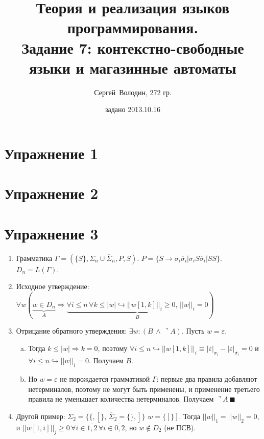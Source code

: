 \documentclass[a4paper]{article}
\title{Теория и реализация языков программирования.\\Задание 7: контекстно-свободные языки и магазинные автоматы}
\date{задано 2013.10.16}
\author{Сергей~Володин, 272 гр.}
\begin{document}
\maketitle
\section*{Упражнение 1}
\section*{Упражнение 2}
\section*{Упражнение 3}
\begin{enumerate}[1.]
\item Грамматика $\Gamma=(\{S\},\Sigma_n\cup\overline{\Sigma}_n,P,S)$. $P=\big\{S\longrightarrow \sigma_i\overline{\sigma}_i|\sigma_iS\overline{\sigma}_i|SS\big\}$. $D_n=L(\Gamma)$.
\item Исходное утверждение: $\forall w\left(\underbrace{w\in D_n}_{A}\Rightarrow\underbrace{\forall i\leqslant n\,\forall k\leqslant |w|\hookrightarrow ||w[1,k]||_i\geqslant 0,\,||w||_i=0}_{B}\right)$
\item Отрицание обратного утверждения: $\exists w\colon \left(B\,\wedge\,\urcorner A\right)$. Пусть $w=\varepsilon$.\begin{enumerate}[a.]
\item Тогда $k\leqslant |w|\Rightarrow k=0$, поэтому $\forall i\leqslant n\hookrightarrow ||w[1,k]||_i\equiv|\varepsilon|_{\sigma_i}-|\varepsilon|_{\overline{\sigma_i}}=0$ и $\forall i\leqslant n\hookrightarrow||w||_i=0$. Получаем $B$.
\item Но $w=\varepsilon$ не порождается грамматикой $\Gamma$: первые два правила добавляют нетерминалов, поэтому не могут быть применены, и применение третьего правила не уменьшает количества нетерминалов. Получаем $\urcorner A\,\blacksquare$
\end{enumerate}
\item Другой пример: $\Sigma_2=\big\{\{,[ \big\},\,\overline{\Sigma}_2=\big\{\},]\big\}$ $w=\{[\}]$.\newline
Тогда $||w||_1=||w||_2=0$, и $||w[1,i]||_j\geqslant 0\,\forall i\in \overline{1,2}\,\forall i\in\overline{0,2}$, но $w\notin D_2$ (не ПСВ).
\end{enumerate}
\end{document}
